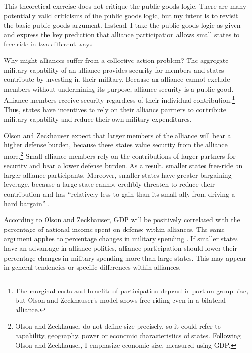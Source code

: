 \documentclass[12pt]{article}
\begin{document}
This theoretical exercise does not critique the public goods logic.
There are many potentially valid criticisms of the public goods logic, but my intent is to revisit the basic public goods argument. 
Instead, I take the public goods logic as given and express the key prediction that alliance participation allows small states to free-ride in two different ways. 


Why might alliances suffer from a collective action problem?
The aggregate military capability of an alliance provides security for members and states contribute by investing in their military.
Because an alliance cannot exclude members without undermining its purpose, alliance security is a public good. 
Alliance members receive security regardless of their individual contribution.\footnote{The marginal costs and benefits of participation depend in part on group size, but Olson and Zeckhauser's model shows free-riding even in a bilateral alliance.}
Thus, states have incentives to rely on their alliance partners to contribute military capability and reduce their own military expenditures.  

 
Olson and Zeckhauser expect that larger members of the alliance will bear a higher defense burden, because these states value security from the alliance more.\footnote{Olson and Zeckhauser do not define size precisely, so it could refer to capability, geography, power or economic characteristics of states. Following Olson and Zeckhauser, I emphasize economic size, measured using GDP.}
Small alliance members rely on the contributions of larger partners for security and bear a lower defense burden.
As a result, smaller states free-ride on larger alliance participants. 
Moreover, smaller states have greater bargaining leverage, because a large state cannot credibly threaten to reduce their contribution and has ``relatively less to gain than its small ally from driving a hard bargain'' \citep[pg. 274]{OlsonZeckhauser1966}. 


According to Olson and Zeckhauser, GDP will be positively correlated with the percentage of national income spent on defense within alliances.
The same argument applies to percentage changes in military spending \citep{PluemperNeumayer2015}. 
If smaller states have an advantage in alliance politics, alliance participation should lower their percentage changes in military spending more than large states. 
This may appear in general tendencies or specific differences within alliances. 
\end{document}
